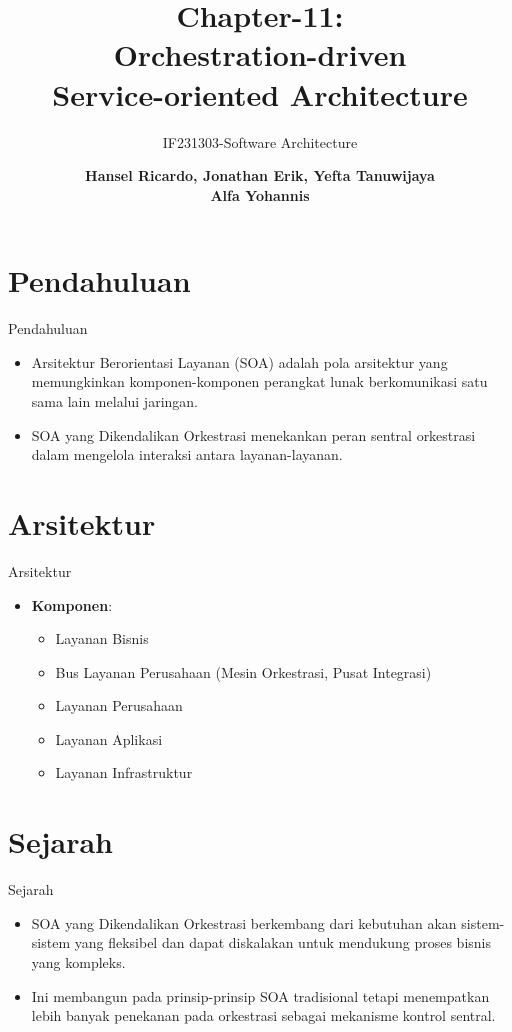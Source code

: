 \documentclass[aspectratio=169, table]{beamer}
\title{Chapter-11:\\Orchestration-driven\\Service-oriented Architecture}
\subtitle{IF231303-Software Architecture}
\author{\textbf{Hansel Ricardo, Jonathan Erik, Yefta Tanuwijaya
        \\Alfa Yohannis}}
\begin{document}
	\begin{frame}[plain]
		\maketitle
	\end{frame}

   \section{Pendahuluan}
   \begin{frame}{Pendahuluan}
       \begin{itemize}
           \item Arsitektur Berorientasi Layanan (SOA) adalah pola arsitektur yang memungkinkan komponen-komponen perangkat lunak berkomunikasi satu sama lain melalui jaringan.
           \item SOA yang Dikendalikan Orkestrasi menekankan peran sentral orkestrasi dalam mengelola interaksi antara layanan-layanan.
       \end{itemize}
   \end{frame}

   \section{Arsitektur}
   \begin{frame}{Arsitektur}
       \begin{itemize}
           \item \textbf{Komponen}:
           \begin{itemize}
               \item Layanan Bisnis
               \item Bus Layanan Perusahaan (Mesin Orkestrasi, Pusat Integrasi)
               \item Layanan Perusahaan
               \item Layanan Aplikasi
               \item Layanan Infrastruktur
           \end{itemize}
       \end{itemize}
   \end{frame}

   \section{Sejarah}
   \begin{frame}{Sejarah}
       \begin{itemize}
           \item SOA yang Dikendalikan Orkestrasi berkembang dari kebutuhan akan sistem-sistem yang fleksibel dan dapat diskalakan untuk mendukung proses bisnis yang kompleks.
           \item Ini membangun pada prinsip-prinsip SOA tradisional tetapi menempatkan lebih banyak penekanan pada orkestrasi sebagai mekanisme kontrol sentral.
       \end{itemize}
   \end{frame}
\end{document}
